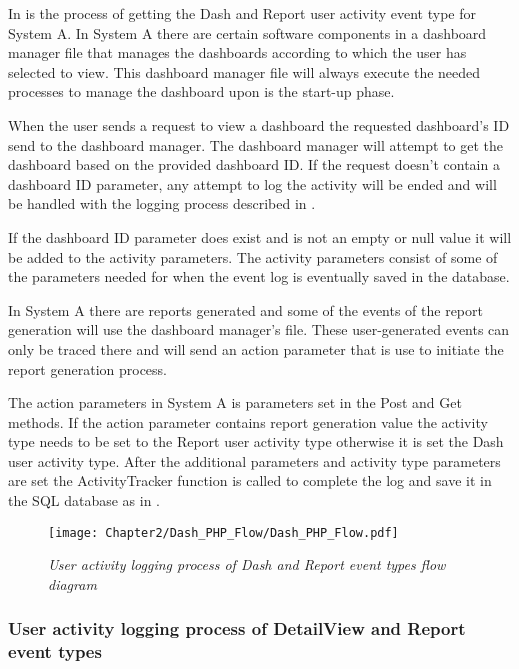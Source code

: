 In  is the process of getting the Dash and Report user activity event type for System A. In System A there are certain software components in a dashboard manager file that manages the dashboards according to which the user has selected to view. This dashboard manager file will always execute the needed processes to manage the dashboard upon is the start-up phase.\par When the user sends a request to view a dashboard the requested dashboard's ID send to the dashboard manager. The dashboard manager will attempt to get the dashboard based on the provided dashboard ID. If the request doesn't contain a dashboard ID parameter, any attempt to log the activity will be ended and will be handled with the logging process described in . \par If the dashboard ID parameter does exist and is not an empty or null value it will be added to the activity parameters. The activity parameters consist of some of the parameters needed for  when the event log is eventually saved in the database. \par In System A there are reports generated and some of the events of the report generation will use the dashboard manager's file. These user-generated events can only be traced there and will send an action parameter that is use to initiate the report generation process.\par The action parameters in System A is parameters set in the Post and Get methods. If the action parameter contains report generation value the activity type needs to be set to the Report user activity type otherwise it is set the Dash user activity type. After the additional parameters and activity type parameters are set the ActivityTracker function is called to complete the log and save it in the SQL database as in . 

\begin{figure}[!htb] %
	\centering %
	\texttt{[image: Chapter2/Dash\_PHP\_Flow/Dash\_PHP\_Flow.pdf]}
	\caption[User activity logging of Dash and Report event types]
	{\textit{User activity logging process of Dash and Report event types flow diagram}}\label{fig:ch2_Dash_PHP_Flow}
\end{figure}

\clearpage

\subsubsection{User activity logging process of DetailView and Report event types}

